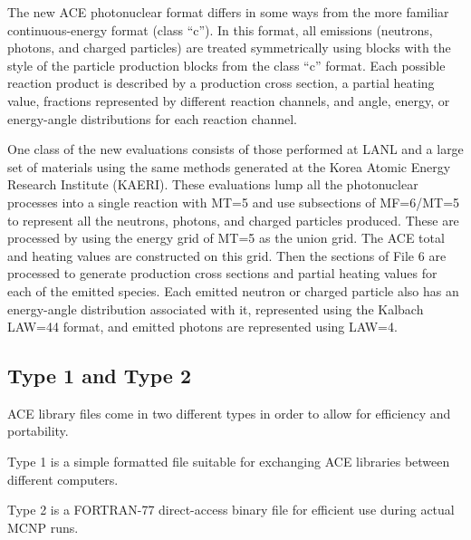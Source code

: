 The new ACE photonuclear format differs in some ways from the
more familiar continuous-energy format (class ``c'').  In this format,
all emissions (neutrons, photons, and charged particles) are
treated symmetrically using blocks with the style of the particle
production blocks from the class ``c'' format.  Each possible
reaction product is described by a production cross section,
a partial heating value, fractions represented by different
reaction channels, and angle, energy, or energy-angle distributions
for each reaction channel.

One class of the new evaluations consists of those performed at
LANL and a large set of materials
using the same methods generated at the Korea Atomic Energy Research
Institute (KAERI).  These evaluations lump all the
photonuclear processes into a single reaction with MT=5 and use
subsections of MF=6/MT=5 to represent all the neutrons, photons,
and charged particles produced.  These are processed by using the
energy grid of MT=5 as the union grid.  The ACE total and heating
values are constructed on this grid.  Then the sections of File 6
are processed to generate production cross sections and partial
heating values for each of the emitted species.  Each emitted
neutron or charged particle also has an energy-angle
distribution associated with it, represented using the Kalbach LAW=44
format, and emitted photons are represented using LAW=4.


\subsection{Type 1 and Type 2}
\label{ssACER_ty12}

ACE library files come in two different types in order to allow
for efficiency and portability.
\begin{itemize}
\begin{singlespace}
\item Type 1 is a simple formatted file suitable for
       exchanging ACE libraries between different computers.

\item Type 2 is a FORTRAN-77 direct-access binary file
       for efficient use during actual MCNP runs.
\end{singlespace}
\end{itemize}
\vspace{3 pt}


